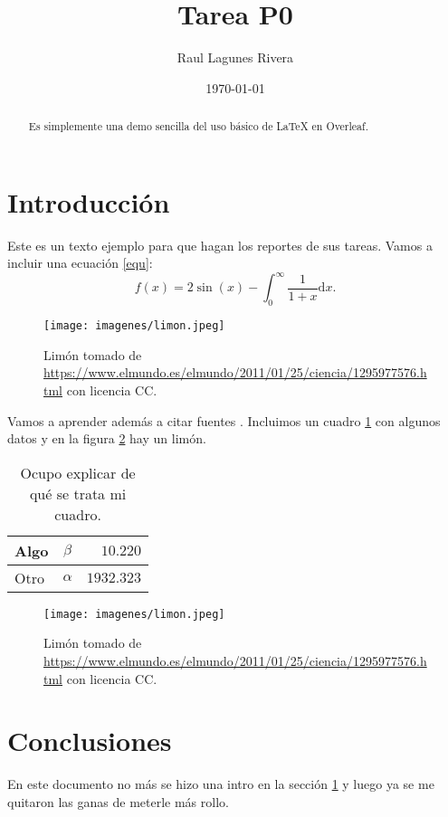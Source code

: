 \documentclass{article}
\author{Raul Lagunes Rivera} %
\title{Tarea P0 } %
\date{\today}
\begin{document}

\maketitle %

\begin{abstract} %
  Es simplemente una demo sencilla del uso b\'{a}sico de \LaTeX{} en
  Overleaf.
\end{abstract}

\section{Introducci\'{o}n}\label{intro} %



Este es un texto ejemplo para que hagan los reportes de sus
tareas. Vamos a incluir una ecuaci\'{o}n \eqref{equ}:
\begin{equation}
  f(x) = 2 \sin(x) - \int_0^\infty \frac{1}{1 + x} \text{d}x.
  \label{equ}
\end{equation}

\begin{figure} %
    \centering
    \texttt{[image: imagenes/limon.jpeg]} %
     
    \caption{Lim\'{o}n tomado de \url{https://www.elmundo.es/elmundo/2011/01/25/ciencia/1295977576.html} con licencia CC.}
    \label{limon}
\end{figure}

\newpage

Vamos a aprender además a citar fuentes \citep{ejemplo}. Incluimos un cuadro \ref{datos} con algunos datos y en la figura \ref{limon} hay un limón.
 \begin{table}[h]
     \caption{Ocupo explicar de qué se trata mi cuadro.}
     \label{datos}
     \centering
     \begin{tabular}{|l|c|r|}
     \hline
          Algo & $\beta$ & $10.220$ \\
          \hline
          Otro & $\alpha$ & $1932.323$\\
          \hline
     \end{tabular}
 \end{table}
\vspace{2cm}
 \begin{figure}[h]
     \centering
     \texttt{[image: imagenes/limon.jpeg]}
     \caption{Limón tomado de \url{https://www.elmundo.es/elmundo/2011/01/25/ciencia/1295977576.html} con licencia CC.}
     \label{limon}
 \end{figure}

 \section{Conclusiones}

 En este documento no más se hizo una intro en la sección \ref{intro} y luego ya se me quitaron las ganas de meterle más rollo.

 
 

 
\end{document}
